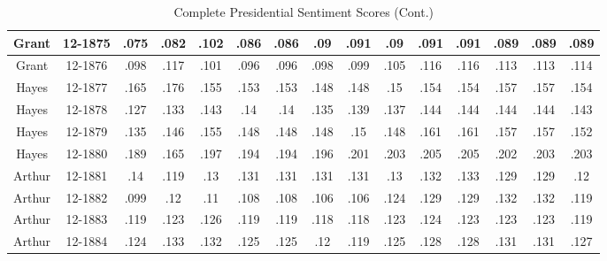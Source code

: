 \begin{sidewaystable}
\begin{singlespace}
\begin{center}
\begin{tabular}{||c c c c c c c c c c c c c c c||}
\hline
Grant & 12-1875 & .075 & .082 & .102 & .086 & .086 & .09 & .091 & .09 & .091 & .091 & .089 & .089 & .089 \\ 
\hline
Grant & 12-1876 & .098 & .117 & .101 & .096 & .096 & .098 & .099 & .105 & .116 & .116 & .113 & .113 & .114 \\ 
\hline
Hayes & 12-1877 & .165 & .176 & .155 & .153 & .153 & .148 & .148 & .15 & .154 & .154 & .157 & .157 & .154 \\ 
\hline
Hayes & 12-1878 & .127 & .133 & .143 & .14 & .14 & .135 & .139 & .137 & .144 & .144 & .144 & .144 & .143 \\ 
\hline
Hayes & 12-1879 & .135 & .146 & .155 & .148 & .148 & .148 & .15 & .148 & .161 & .161 & .157 & .157 & .152 \\ 
\hline
Hayes & 12-1880 & .189 & .165 & .197 & .194 & .194 & .196 & .201 & .203 & .205 & .205 & .202 & .203 & .203 \\ 
\hline
Arthur & 12-1881 & .14 & .119 & .13 & .131 & .131 & .131 & .131 & .13 & .132 & .133 & .129 & .129 & .12 \\ 
\hline
Arthur & 12-1882 & .099 & .12 & .11 & .108 & .108 & .106 & .106 & .124 & .129 & .129 & .132 & .132 & .119 \\ 
\hline
Arthur & 12-1883 & .119 & .123 & .126 & .119 & .119 & .118 & .118 & .123 & .124 & .123 & .123 & .123 & .119 \\ 
\hline
Arthur & 12-1884 & .124 & .133 & .132 & .125 & .125 & .12 & .119 & .125 & .128 & .128 & .131 & .131 & .127 \\ 
\hline
 \hline
 \end{tabular}
\end{center}
\caption{Complete Presidential Sentiment Scores (Cont.)}
\label{appendix:sent4}
\end{singlespace}
\end{sidewaystable}

